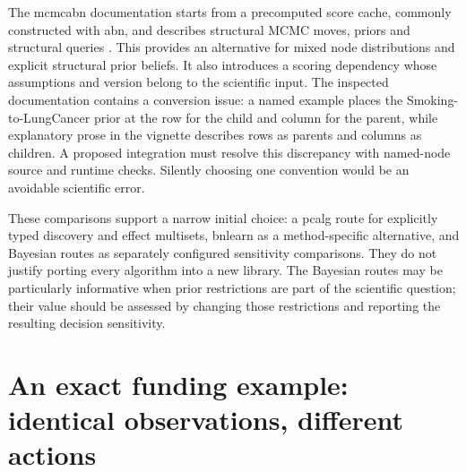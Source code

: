 The mcmcabn documentation starts from a precomputed score cache, commonly
constructed with abn, and describes structural MCMC moves, priors and
structural queries \citep{exec13_mcmcabn}. This provides an alternative for
mixed node distributions and explicit structural prior beliefs. It also
introduces a scoring dependency whose assumptions and version belong to the
scientific input. The inspected documentation contains a conversion issue:
a named example places the Smoking-to-LungCancer prior at the row for the
child and column for the parent, while explanatory prose in the vignette
describes rows as parents and columns as children. A proposed integration
must resolve this discrepancy with named-node source and runtime checks.
Silently choosing one convention would be an avoidable scientific error.

These comparisons support a narrow initial choice: a pcalg route for explicitly
typed discovery and effect multisets, bnlearn as a method-specific alternative,
and Bayesian routes as separately configured sensitivity comparisons.
They do not justify porting every algorithm into a new library. The Bayesian
routes may be particularly informative when prior restrictions are part of
the scientific question; their value should be assessed by changing those
restrictions and reporting the resulting decision sensitivity.

\section{An exact funding example: identical observations, different actions}

